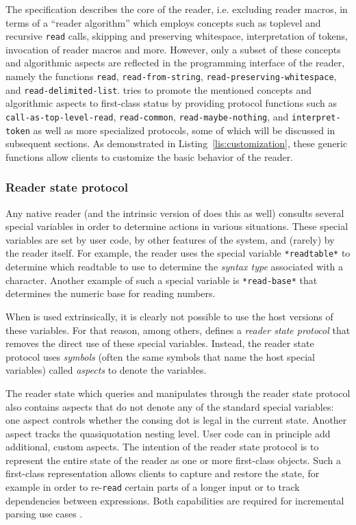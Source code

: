 The \cl{} specification describes the core of the reader,
i.e. excluding reader macros, in terms of a ``reader algorithm'' which
employs concepts such as toplevel and recursive \texttt{read} calls,
skipping and preserving whitespace, interpretation of tokens,
invocation of reader macros and more.  However, only a subset of these
concepts and algorithmic aspects are reflected in the programming
interface of the \cl{} reader, namely the functions \texttt{read},
\texttt{read-from-string}, \texttt{read-preserving-whitespace}, and
\texttt{read-delimited-list}.  \eclector{} tries to promote the
mentioned concepts and algorithmic aspects to first-class status by
providing protocol functions such as \texttt{call-as-top-level-read},
\texttt{read-common}, \texttt{read-maybe-nothing}, and
\texttt{interpret-token} as well as more specialized protocols, some of
which will be discussed in subsequent sections.  As demonstrated in
Listing~\ref{lis:customization}, these generic functions allow clients
to customize the basic behavior of the reader.


\subsubsection{Reader state protocol}
\label{sec:reader-state-protocol}

Any native \cl{} reader (and the intrinsic version of \eclector{} does
this as well) consults several special variables in order to determine
actions in various situations.  These special variables are set by
user code, by other features of the \cl{} system, and (rarely) by the
reader itself.  For example, the reader uses the special variable
\texttt{*readtable*} to determine which readtable to use to determine
the \emph{syntax type} associated with a character.  Another example
of such a special variable is \texttt{*read-base*} that determines the
numeric base for reading numbers.

When \eclector{} is used extrinsically, it is clearly not possible to
use the host versions of these variables.  For that reason, among
others, \eclector{} defines a \emph{reader state protocol} that
removes the direct use of these special variables.  Instead, the
reader state protocol uses \emph{symbols} (often the same symbols that
name the host special variables) called \emph{aspects} to denote the
variables.

The reader state which \eclector{} queries and manipulates through the
reader state protocol also contains aspects that do not denote any of
the standard special variables: one aspect controls whether the
consing dot is legal in the current state.  Another aspect tracks the
quasiquotation nesting level.  User code can in principle add
additional, custom aspects.  The intention of the reader state
protocol is to represent the entire state of the reader as one or more
first-class objects.  Such a first-class representation allows clients
to capture and restore the state, for example in order to
re-\texttt{read} certain parts of a longer input or to track
dependencies between expressions.  Both capabilities are required for
incremental parsing use cases .

